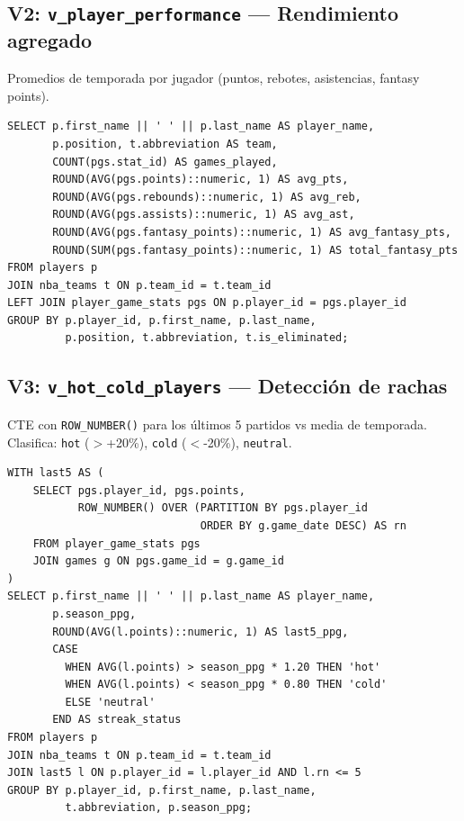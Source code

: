 \documentclass[12pt,a4paper]{article}
\begin{document}
\subsection{V2: \texttt{v\_player\_performance} --- Rendimiento agregado}

Promedios de temporada por jugador (puntos, rebotes, asistencias, fantasy points).

\begin{lstlisting}
SELECT p.first_name || ' ' || p.last_name AS player_name,
       p.position, t.abbreviation AS team,
       COUNT(pgs.stat_id) AS games_played,
       ROUND(AVG(pgs.points)::numeric, 1) AS avg_pts,
       ROUND(AVG(pgs.rebounds)::numeric, 1) AS avg_reb,
       ROUND(AVG(pgs.assists)::numeric, 1) AS avg_ast,
       ROUND(AVG(pgs.fantasy_points)::numeric, 1) AS avg_fantasy_pts,
       ROUND(SUM(pgs.fantasy_points)::numeric, 1) AS total_fantasy_pts
FROM players p
JOIN nba_teams t ON p.team_id = t.team_id
LEFT JOIN player_game_stats pgs ON p.player_id = pgs.player_id
GROUP BY p.player_id, p.first_name, p.last_name,
         p.position, t.abbreviation, t.is_eliminated;
\end{lstlisting}

\subsection{V3: \texttt{v\_hot\_cold\_players} --- Detecci\'on de rachas}

CTE con \texttt{ROW\_NUMBER()} para los \'ultimos 5 partidos vs media de temporada.
Clasifica: \texttt{hot} ($>$+20\%), \texttt{cold} ($<$-20\%), \texttt{neutral}.

\begin{lstlisting}
WITH last5 AS (
    SELECT pgs.player_id, pgs.points,
           ROW_NUMBER() OVER (PARTITION BY pgs.player_id
                              ORDER BY g.game_date DESC) AS rn
    FROM player_game_stats pgs
    JOIN games g ON pgs.game_id = g.game_id
)
SELECT p.first_name || ' ' || p.last_name AS player_name,
       p.season_ppg,
       ROUND(AVG(l.points)::numeric, 1) AS last5_ppg,
       CASE
         WHEN AVG(l.points) > season_ppg * 1.20 THEN 'hot'
         WHEN AVG(l.points) < season_ppg * 0.80 THEN 'cold'
         ELSE 'neutral'
       END AS streak_status
FROM players p
JOIN nba_teams t ON p.team_id = t.team_id
JOIN last5 l ON p.player_id = l.player_id AND l.rn <= 5
GROUP BY p.player_id, p.first_name, p.last_name,
         t.abbreviation, p.season_ppg;
\end{lstlisting}
\end{document}
